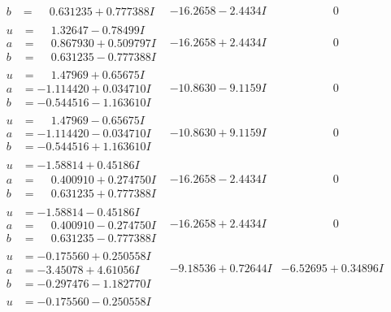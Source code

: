 \documentclass[1p]{elsarticle_modified}
\theoremstyle{definition}
\begin{document}
$$\begin{array}{c|c|c}
\begin{aligned}
b &= \phantom{-}0.631235 + 0.777388 I\end{aligned}
 & -16.2658 - 2.4434 I & \phantom{-0.000000 } 0 \\ \hline\begin{aligned}
u &= \phantom{-}1.32647 - 0.78499 I \\
a &= \phantom{-}0.867930 + 0.509797 I \\
b &= \phantom{-}0.631235 - 0.777388 I\end{aligned}
 & -16.2658 + 2.4434 I & \phantom{-0.000000 } 0 \\ \hline\begin{aligned}
u &= \phantom{-}1.47969 + 0.65675 I \\
a &= -1.114420 + 0.034710 I \\
b &= -0.544516 - 1.163610 I\end{aligned}
 & -10.8630 - 9.1159 I & \phantom{-0.000000 } 0 \\ \hline\begin{aligned}
u &= \phantom{-}1.47969 - 0.65675 I \\
a &= -1.114420 - 0.034710 I \\
b &= -0.544516 + 1.163610 I\end{aligned}
 & -10.8630 + 9.1159 I & \phantom{-0.000000 } 0 \\ \hline\begin{aligned}
u &= -1.58814 + 0.45186 I \\
a &= \phantom{-}0.400910 + 0.274750 I \\
b &= \phantom{-}0.631235 + 0.777388 I\end{aligned}
 & -16.2658 - 2.4434 I & \phantom{-0.000000 } 0 \\ \hline\begin{aligned}
u &= -1.58814 - 0.45186 I \\
a &= \phantom{-}0.400910 - 0.274750 I \\
b &= \phantom{-}0.631235 - 0.777388 I\end{aligned}
 & -16.2658 + 2.4434 I & \phantom{-0.000000 } 0 \\ \hline\begin{aligned}
u &= -0.175560 + 0.250558 I \\
a &= -3.45078 + 4.61056 I \\
b &= -0.297476 - 1.182770 I\end{aligned}
 & -9.18536 + 0.72644 I & -6.52695 + 0.34896 I \\ \hline\begin{aligned}
u &= -0.175560 - 0.250558 I \\

\end{aligned}
\end{array}$$
\end{document}
